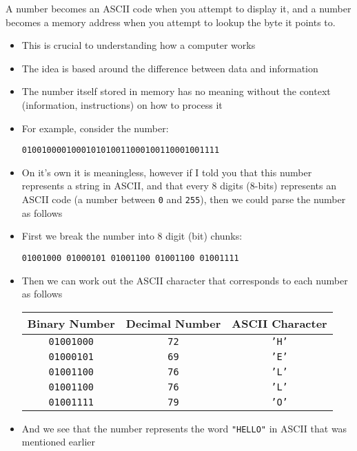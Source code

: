 \documentclass{article}
\newcommand {\code}{\texttt}
\begin{document}
	A number becomes an ASCII code when you attempt to display it, and a number becomes
	a memory address when you attempt to lookup the byte it points to.
	\begin {itemize}
		\item This is crucial to understanding how a computer works
		\item The idea is based around the difference between data and information
		\item The number itself stored in memory has no meaning without the context
			(information, instructions) on how to process it
		\item For example, consider the number: 
		\begin {center}
			\code {0100100001000101010011000100110001001111}
		\end {center}
		\item On it's own it is meaningless, however if I told you that this 
			number represents a string in ASCII, and that every 
			8 digits (8-bits) represents an ASCII code (a number between 
			\code 0 and \code {255}), then we could parse the number as follows
		\item First we break the number into 8 digit (bit) chunks:
			\begin {center}
				\code {01001000 01000101 01001100 01001100 01001111}
			\end {center}
		\item Then we can work out the ASCII character that corresponds to each
			number as follows
			\label {tab:ascii_conversion_ex}
			\begin {center}
				\begin {tabular}{ccc}
					\hline
					\textbf {Binary Number}
						& \textbf {Decimal Number}	
						& \textbf {ASCII Character}	
					\\
					\hline
					\code {01001000}	&	\code {72}		&	\code {'H'}		\\
					\code {01000101}	&	\code {69}		&	\code {'E'}		\\
					\code {01001100}	&	\code {76}		&	\code {'L'}		\\
					\code {01001100}	&	\code {76}		&	\code {'L'}		\\
					\code {01001111}	&	\code {79}		&	\code {'O'}		\\
					\hline
				\end {tabular}
			\end {center}
		\item And we see that the number represents the word \code {"HELLO"} in 
			ASCII that was mentioned earlier
	\end {itemize}
	
\end{document}

